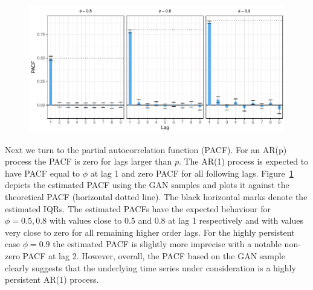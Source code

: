\documentclass[12pt]{article}
\newcommand{\re}[1]{\textcolor{blue}{[#1]}}
\begin{document}
\begin{figure}[t!]
\centering
\hspace{-1em}\includegraphics[width=\textwidth]{pacfs_GB.pdf}
\label{figure:pacf}
\end{figure}

Next we turn to the partial autocorrelation function (PACF). %
For an AR(p) process the PACF is zero for lags larger than $p$. The AR(1) process is expected to have PACF equal to $\phi$ at lag 1 and zero PACF for all following lags. Figure~\ref{figure:pacf} depicts the estimated PACF using the GAN samples and plots it against the theoretical PACF (horizontal dotted line). The black horizontal marks denote the estimated IQRs. The estimated PACFs have the expected behaviour for $\phi = 0.5, 0.8$ with values close to 0.5 and 0.8 at lag 1 respectively and with values very close to zero for all remaining higher order lags. For the highly persistent case $\phi = 0.9$ the estimated PACF is slightly more imprecise with a notable non-zero PACF at lag 2. However, overall, the PACF based on the GAN sample clearly suggests that the underlying time series under consideration is a highly persistent AR(1) process.
\end{document}
